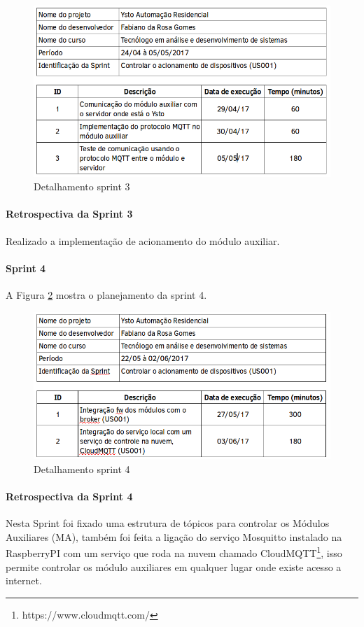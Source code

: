 \begin{figure}[H]
\caption{\label{sprint-3} Detalhamento sprint 3}
\includegraphics[scale=0.5]{img/sprint-2.png}
\end{figure}

\paragraph{Retrospectiva da Sprint 3} Realizado a implementação de acionamento do módulo auxiliar.

\paragraph{Sprint 4} A Figura \ref{sprint-4} mostra o planejamento da sprint 4.

\begin{figure}[H]
\caption{\label{sprint-4} Detalhamento sprint 4}
\includegraphics[scale=0.5]{img/sprint-4.png}
\end{figure}


\paragraph{Retrospectiva da Sprint 4} Nesta Sprint foi fixado uma estrutura de tópicos para controlar os Módulos Auxiliares (MA), também foi feita a ligação do serviço Mosquitto instalado na RaspberryPI com um serviço que roda na nuvem chamado CloudMQTT\footnote{https://www.cloudmqtt.com/}, isso permite controlar os módulo auxiliares em qualquer lugar onde existe acesso a internet.

